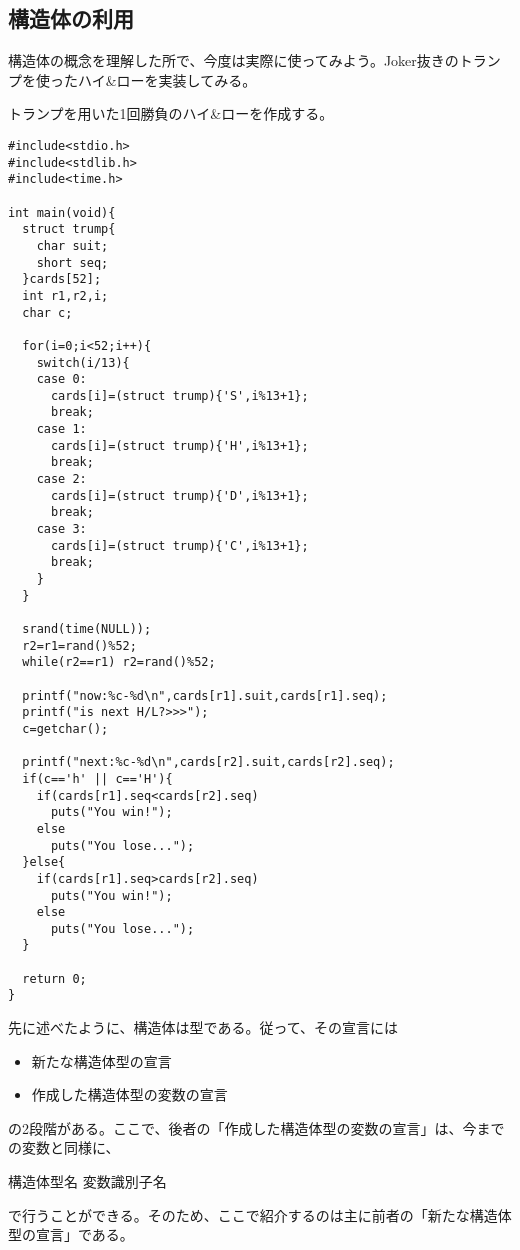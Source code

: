 \subsection{構造体の利用}
構造体の概念を理解した所で、今度は実際に使ってみよう。Joker抜きのトランプを使ったハイ\&ローを実装してみる。
\begin{boxnote}
トランプを用いた1回勝負のハイ\&ローを作成する。
\begin{multicols}{2}
\begin{lstlisting}[caption=トランプ版ハイ\&ロー,label=program9_1]
#include<stdio.h>
#include<stdlib.h>
#include<time.h>

int main(void){
  struct trump{
    char suit;
    short seq;
  }cards[52];
  int r1,r2,i;
  char c;

  for(i=0;i<52;i++){
    switch(i/13){
    case 0:
      cards[i]=(struct trump){'S',i%13+1};
      break;
    case 1:
      cards[i]=(struct trump){'H',i%13+1};
      break;
    case 2:
      cards[i]=(struct trump){'D',i%13+1};
      break;
    case 3:
      cards[i]=(struct trump){'C',i%13+1};
      break;
    }
  }
  
  srand(time(NULL));
  r2=r1=rand()%52;
  while(r2==r1) r2=rand()%52;
  
  printf("now:%c-%d\n",cards[r1].suit,cards[r1].seq);
  printf("is next H/L?>>>");
  c=getchar();

  printf("next:%c-%d\n",cards[r2].suit,cards[r2].seq);
  if(c=='h' || c=='H'){
    if(cards[r1].seq<cards[r2].seq)
      puts("You win!");
    else
      puts("You lose...");
  }else{
    if(cards[r1].seq>cards[r2].seq)
      puts("You win!");
    else
      puts("You lose...");
  }

  return 0;
}
\end{lstlisting}
\end{multicols}
\end{boxnote}
先に述べたように、構造体は型である。従って、その宣言には
\begin{itemize}
\item 新たな構造体型の宣言
\item 作成した構造体型の変数の宣言
\end{itemize}
の2段階がある。ここで、後者の「作成した構造体型の変数の宣言」は、今までの変数と同様に、
\begin{code}
構造体型名 変数識別子名
\end{code}
で行うことができる。そのため、ここで紹介するのは主に前者の「新たな構造体型の宣言」である。
\\ \\　
